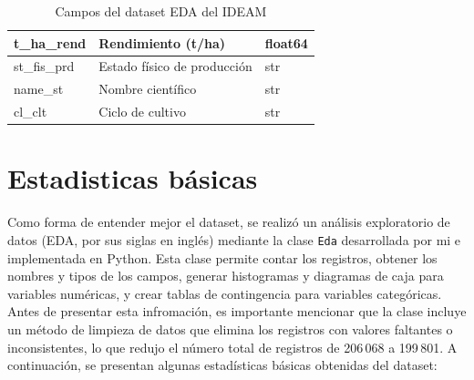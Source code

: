 \documentclass[12pt,a4paper]{article}
\begin{document}
\begin{table}[H]
\begin{tabular}{|l|l|l|}
        t\_ha\_rend                                 & Rendimiento (t/ha)                            & float64                            \\ \hline
        st\_fis\_prd                                & Estado físico de producción                   & str                                \\ \hline
        name\_st                                    & Nombre científico                             & str                                \\ \hline
        cl\_clt                                     & Ciclo de cultivo                              & str                                \\ \hline
    \end{tabular}
    \caption{Campos del dataset EDA del IDEAM}
    \label{tab:campos}
\end{table}

% 
\section{Estadisticas básicas}
Como forma de entender mejor el dataset, se realizó un análisis exploratorio de datos (EDA, por sus siglas en inglés)
mediante la clase \texttt{Eda} desarrollada por mi e implementada en Python. Esta clase permite contar los registros, 
obtener los nombres y tipos de los campos, generar histogramas y diagramas de caja para variables numéricas,
y crear tablas de contingencia para variables categóricas. Antes de presentar esta infromación, es importante mencionar 
que la clase incluye un método de limpieza de datos que elimina los registros con valores faltantes o inconsistentes, lo
que redujo el número total de registros de 206\,068 a 199\,801. A continuación, se presentan algunas estadísticas básicas 
obtenidas del dataset:
\end{document}
